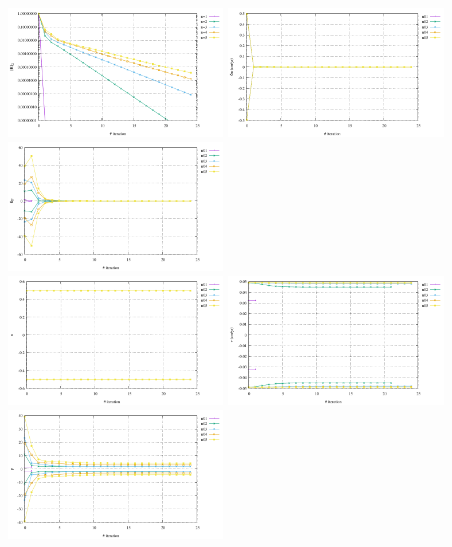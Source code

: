 \begin{center}
\includegraphics[width=5.7cm]{python_codes/fieldstone_87/results/experiment_05/conv}
\includegraphics[width=5.7cm]{python_codes/fieldstone_87/results/experiment_05/du}
\includegraphics[width=5.7cm]{python_codes/fieldstone_87/results/experiment_05/dp}\\
\includegraphics[width=5.7cm]{python_codes/fieldstone_87/results/experiment_05/u}
\includegraphics[width=5.7cm]{python_codes/fieldstone_87/results/experiment_05/v}
\includegraphics[width=5.7cm]{python_codes/fieldstone_87/results/experiment_05/p}
\end{center}



